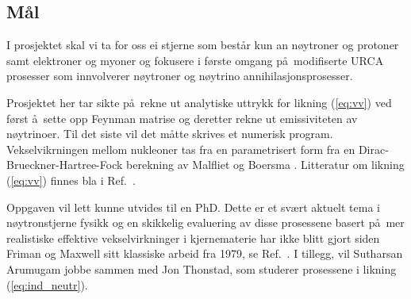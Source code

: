 \subsection*{M\aa l}
I prosjektet skal vi ta for oss ei stjerne som best\aa r kun an n\o ytroner
og protoner samt elektroner og myoner
og fokusere i f\o rste omgang p\aa\ modifiserte URCA
prosesser som innvolverer n\o ytroner og n\o ytrino annihilasjonsprosesser.

Prosjektet her tar sikte p\aa\ rekne ut analytiske uttrykk for likning
(\ref{eq:vv}) ved f\o rst \aa\ sette opp Feynman matrise og deretter
rekne ut emissiviteten av n\o ytrinoer. Til det siste vil det m\aa tte skrives et numerisk program.
Vekselvikrningen mellom nukleoner tas fra en parametrisert form
fra en Dirac-Brueckner-Hartree-Fock berekning av Malfliet og Boersma
\cite{malfliet}. 
Litteratur om likning (\ref{eq:vv}) finnes bla i Ref.~\cite{armen1,armen2}.

Oppgaven vil lett kunne utvides til en PhD. Dette er et sv\ae rt aktuelt tema 
i n\o ytronstjerne fysikk og en skikkelig evaluering av disse prosessene 
basert p\aa\ mer realistiske effektive vekselvirkninger i kjernematerie
har ikke blitt gjort siden Friman og Maxwell sitt klassiske arbeid fra
1979, se Ref.~\cite{fm79}.
I tillegg, vil Sutharsan  Arumugam jobbe sammen med Jon Thonstad, som studerer
prosessene i likning (\ref{eq:ind_neutr}).




